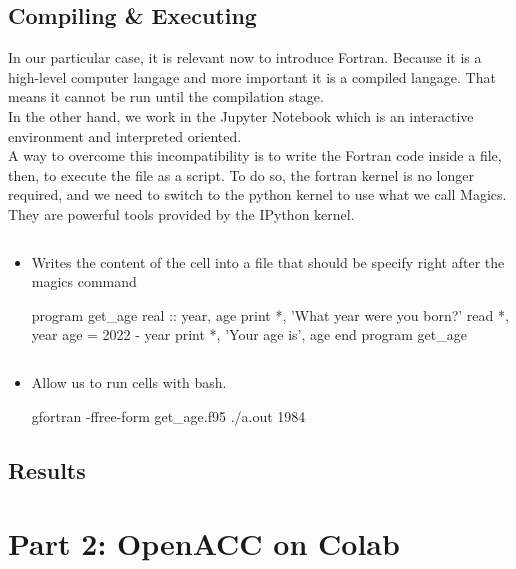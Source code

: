 \documentclass[10pt,a4paper]{article}
\begin{document}
\subsection{Compiling \& Executing}
In our particular case, it is relevant now to introduce Fortran. Because it is a high-level computer langage and more important it is a compiled langage. That means it cannot be run until the compilation stage.\\
In the other hand, we work in the Jupyter Notebook which is an interactive environment and interpreted oriented.\\
A way to overcome this incompatibility is to write the Fortran code inside a file, then, to execute the file as a script.
To do so, the fortran kernel is no longer required, and we need to switch to the python kernel to use what we call Magics. They are powerful tools provided by the IPython kernel.
\begin{itemize}

\item
\begin{lstlisting}[language=bash]
%%writefile
\end{lstlisting}
Writes the content of the cell into a file that should be specify right after the magics command
\begin{mylisting}

program get_age
    real :: year, age
    print *, 'What year were you born?'
    read *, year
    age = 2022 - year
    print *, 'Your age is', age
end program get_age
\end{mylisting}
\item 
\begin{lstlisting}[language=bash]
%%bash
\end{lstlisting}
Allow us to run cells with bash.
\begin{mylisting}

gfortran -ffree-form get_age.f95
./a.out
1984
\end{mylisting}
\end{itemize}
\subsection{Results}

\section{Part 2: OpenACC on Colab}
\end{document}
